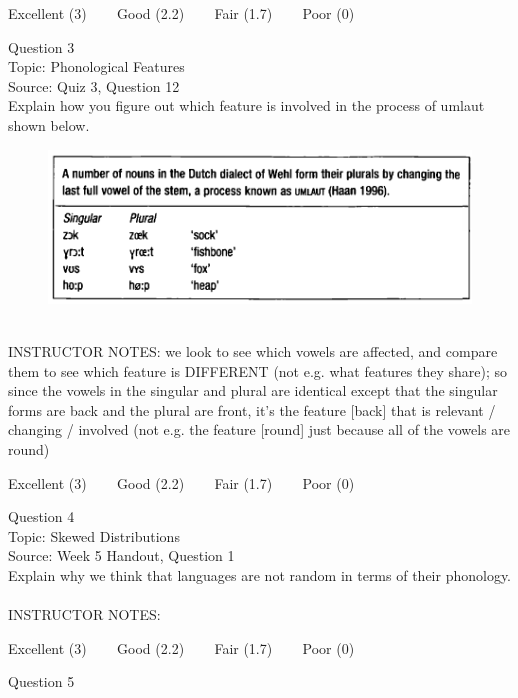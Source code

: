 \documentclass[12pt]{article}
\begin{document}
\vfill
Excellent (3) ~~~ Good (2.2) ~~~ Fair (1.7) ~~~ Poor (0)
\newpage

{\large Question 3}\\

Topic: Phonological Features\\
Source: Quiz 3, Question 12\\

Explain how you figure out which feature is involved in the process of umlaut shown below.\\

\begin{figure}[H]
\includegraphics{../images/dutch.png}
\end{figure}

~\\
INSTRUCTOR NOTES: we look to see which vowels are affected, and compare them to see which feature is DIFFERENT (not e.g. what features they share); so since the vowels in the singular and plural are identical except that the singular forms are back and the plural are front, it's the feature [back] that is relevant / changing / involved (not e.g. the feature [round] just because all of the vowels are round)


\vfill
Excellent (3) ~~~ Good (2.2) ~~~ Fair (1.7) ~~~ Poor (0)
\newpage

{\large Question 4}\\

Topic: Skewed Distributions\\
Source: Week 5 Handout, Question 1\\

Explain why we think that languages are not random in terms of their phonology.\\


~\\
INSTRUCTOR NOTES: 


\vfill
Excellent (3) ~~~ Good (2.2) ~~~ Fair (1.7) ~~~ Poor (0)
\newpage

{\large Question 5}\\
\end{document}
